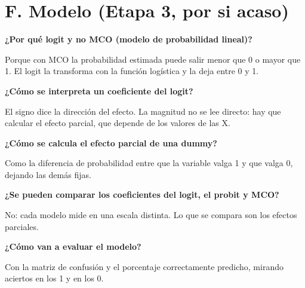 \documentclass[11pt]{article}
\begin{document}
\section*{F. Modelo (Etapa 3, por si acaso)}

\textbf{¿Por qué logit y no MCO (modelo de probabilidad lineal)?}\par
\begin{guion}Porque con MCO la probabilidad estimada puede salir menor que 0 o mayor que 1. El logit la transforma con la función logística y la deja entre 0 y 1.\end{guion}

\textbf{¿Cómo se interpreta un coeficiente del logit?}\par
\begin{guion}El signo dice la dirección del efecto. La magnitud no se lee directo: hay que calcular el efecto parcial, que depende de los valores de las X.\end{guion}

\textbf{¿Cómo se calcula el efecto parcial de una dummy?}\par
\begin{guion}Como la diferencia de probabilidad entre que la variable valga 1 y que valga 0, dejando las demás fijas.\end{guion}

\textbf{¿Se pueden comparar los coeficientes del logit, el probit y MCO?}\par
\begin{guion}No: cada modelo mide en una escala distinta. Lo que se compara son los efectos parciales.\end{guion}

\textbf{¿Cómo van a evaluar el modelo?}\par
\begin{guion}Con la matriz de confusión y el porcentaje correctamente predicho, mirando aciertos en los 1 y en los 0.\end{guion}
\end{document}
